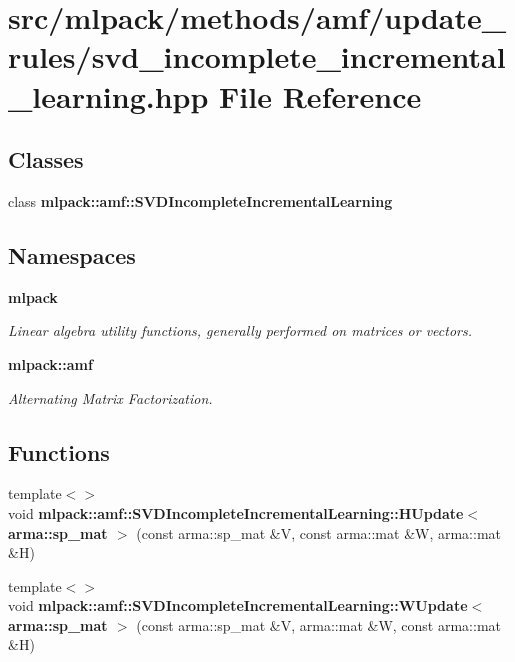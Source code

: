 \section{src/mlpack/methods/amf/update\-\_\-rules/svd\-\_\-incomplete\-\_\-incremental\-\_\-learning.hpp File Reference}
\label{svd__incomplete__incremental__learning_8hpp}
\subsection*{Classes}
\begin{DoxyCompactItemize}
\item 
class {\bf mlpack\-::amf\-::\-S\-V\-D\-Incomplete\-Incremental\-Learning}
\end{DoxyCompactItemize}
\subsection*{Namespaces}
\begin{DoxyCompactItemize}
\item 
{\bf mlpack}
\begin{DoxyCompactList}\small\item\em Linear algebra utility functions, generally performed on matrices or vectors. \end{DoxyCompactList}\item 
{\bf mlpack\-::amf}
\begin{DoxyCompactList}\small\item\em Alternating Matrix Factorization. \end{DoxyCompactList}\end{DoxyCompactItemize}
\subsection*{Functions}
\begin{DoxyCompactItemize}
\item 
{\footnotesize template$<$$>$ }\\void {\bf mlpack\-::amf\-::\-S\-V\-D\-Incomplete\-Incremental\-Learning\-::\-H\-Update$<$ arma\-::sp\-\_\-mat $>$} (const arma\-::sp\-\_\-mat \&V, const arma\-::mat \&W, arma\-::mat \&H)
\item 
{\footnotesize template$<$$>$ }\\void {\bf mlpack\-::amf\-::\-S\-V\-D\-Incomplete\-Incremental\-Learning\-::\-W\-Update$<$ arma\-::sp\-\_\-mat $>$} (const arma\-::sp\-\_\-mat \&V, arma\-::mat \&W, const arma\-::mat \&H)
\end{DoxyCompactItemize}
